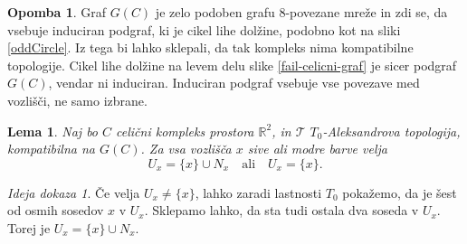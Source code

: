 \documentclass[a4paper, 12pt]{book}
\newtheorem{lemma}{Lema}[section]
\theoremstyle{definition}
\newtheorem{note}{Opomba}[section]
\theoremstyle{remark}
\newtheorem*{sketch}{Ideja dokaza}
\begin{document}
\newpage
\begin{note}
  Graf $G(C)$ je zelo podoben grafu 8-povezane mreže in zdi se, da vsebuje induciran
  podgraf, ki je cikel lihe dolžine, podobno kot na sliki \ref{oddCircle}. Iz tega
  bi lahko sklepali, da tak kompleks nima kompatibilne topologije. Cikel lihe dolžine
  na levem delu slike \ref{fail-celicni-graf} je sicer podgraf $G(C)$, vendar ni induciran.
  Induciran podgraf vsebuje vse povezave med vozlišči, ne samo izbrane.
\end{note}
\begin{lemma}
  Naj bo $C$ celični kompleks prostora $\mathbb{R}^2$, in $\mathcal{T}$ $T_0$-Aleksandrova
  topologija, kompatibilna na $G(C)$. Za vsa vozlišča $x$ sive ali modre barve velja
  \[U_x = \{x\} \cup N_x \quad \text{ali} \quad U_x = \{x\}\text{.}\]
\end{lemma}
\begin{sketch}
  Če velja $U_x \neq \{x\}$, lahko zaradi lastnosti $T_0$ pokažemo, da je šest od
  osmih sosedov $x$ v $U_x$. Sklepamo lahko, da sta tudi ostala dva soseda v $U_x$.
  Torej je $U_x = \{x\} \cup N_x$.
\end{sketch}
\end{document}
